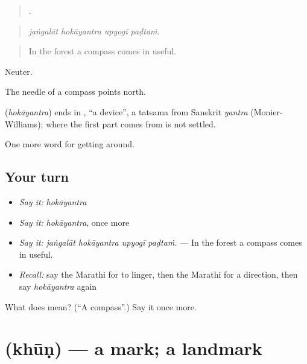 \begin{quote}
   .
\end{quote}

\begin{quote}
\emph{jaṅgalāt hokāyantra upyogī paḍtaṁ.}
\end{quote}

\begin{quote}
In the forest a compass comes in useful.
\end{quote}

Neuter.

The needle of a compass points north.

\begin{cousinweb}
\textbf{} (\emph{hokāyantra}) ends in \textbf{}, \textquotedblleft{}a device\textquotedblright{}, a tatsama from Sanskrit \emph{yantra} (Monier-Williams); where the first part comes from is not settled.
\end{cousinweb}

\begin{grammarlens}[title={What you've built}]
One more word for getting around.
\end{grammarlens}

\subsection*{Your turn}
\begin{itemize}
\raggedright
  \item \emph{Say it:} \emph{hokāyantra}
  \item \emph{Say it:} \emph{hokāyantra}, once more
  \item \emph{Say it:} \emph{jaṅgalāt hokāyantra upyogī paḍtaṁ.} — In the forest a compass comes in useful.
  \item \emph{Recall:} say the Marathi for to linger, then the Marathi for a direction, then say \emph{hokāyantra} again
\end{itemize}

\begin{tcolorbox}[breakable,colback=teal!4,colframe=teal!35!black,title={Before you move on}]
What does  mean? (\textquotedblleft{}A compass\textquotedblright{}.) Say it once more.
\end{tcolorbox}
\section[\texorpdfstring{\mr{खूण} (khūṇ)}{खूण (khūṇ)}]{ (khūṇ) — a mark; a landmark}

